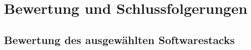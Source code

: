 \chapter{Bewertung und Schlussfolgerungen}\label{sec:bewertung}
\section{Bewertung des ausgewählten Softwarestacks}